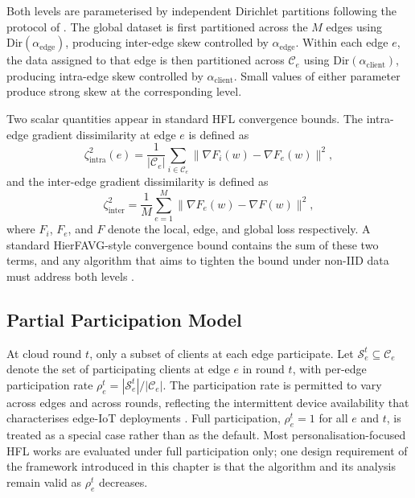 Both levels are parameterised by independent Dirichlet partitions following the protocol of \cite{hsu2019measuring}. The global dataset is first partitioned across the $M$ edges using $\text{Dir}(\alpha_{\text{edge}})$, producing inter-edge skew controlled by $\alpha_{\text{edge}}$. Within each edge $e$, the data assigned to that edge is then partitioned across $\mathcal{C}_e$ using $\text{Dir}(\alpha_{\text{client}})$, producing intra-edge skew controlled by $\alpha_{\text{client}}$. Small values of either parameter produce strong skew at the corresponding level.

Two scalar quantities appear in standard HFL convergence bounds. The intra-edge gradient dissimilarity at edge $e$ is defined as
\begin{equation}
\label{eq:zeta-intra}
\zeta_{\text{intra}}^{2}(e) = \frac{1}{|\mathcal{C}_e|} \sum_{i \in \mathcal{C}_e} \big\| \nabla F_i(w) - \nabla F_e(w) \big\|^{2},
\end{equation}
and the inter-edge gradient dissimilarity is defined as
\begin{equation}
\label{eq:zeta-inter}
\zeta_{\text{inter}}^{2} = \frac{1}{M} \sum_{e=1}^{M} \big\| \nabla F_e(w) - \nabla F(w) \big\|^{2},
\end{equation}
where $F_i$, $F_e$, and $F$ denote the local, edge, and global loss respectively. A standard HierFAVG-style convergence bound contains the sum of these two terms, and any algorithm that aims to tighten the bound under non-IID data must address both levels \cite{fang2024hierarchical, jiang2024partial}.

\subsection{Partial Participation Model}
\label{subsec:fedge-participation}

At cloud round $t$, only a subset of clients at each edge participate. Let $\mathcal{S}_e^t \subseteq \mathcal{C}_e$ denote the set of participating clients at edge $e$ in round $t$, with per-edge participation rate $\rho_e^t = |\mathcal{S}_e^t| / |\mathcal{C}_e|$. The participation rate is permitted to vary across edges and across rounds, reflecting the intermittent device availability that characterises edge-IoT deployments \cite{kairouz2021advances}. Full participation, $\rho_e^t = 1$ for all $e$ and $t$, is treated as a special case rather than as the default. Most personalisation-focused HFL works \cite{ma2024personalized, lee2025phefl} are evaluated under full participation only; one design requirement of the framework introduced in this chapter is that the algorithm and its analysis remain valid as $\rho_e^t$ decreases.

